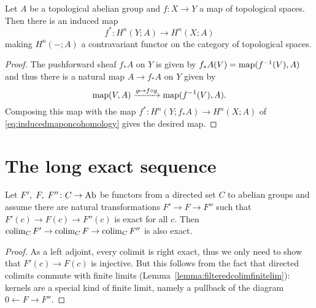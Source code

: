 \documentclass[a4paper,openany]{scrbook}
\begin{document}
\begin{lemma}
Let $A$ be a topological abelian group and $f\colon X \to Y$ a map of topological spaces. Then there is an induced map
\[
f^*\colon H^n(Y;A) \to H^n(X;A)
\]
making $H^n(-;A)$ a contravariant functor on the category of topological spaces.
\end{lemma}
\begin{proof}
The pushforward sheaf $f_*A$ on $Y$ is given by $f_*A(V) = \operatorname{map}(f^{-1}(V),A)$ and thus there is a natural map $A \to f_*A$ on $Y$ given by
\[
\operatorname{map}(V,A) \xrightarrow{g \mapsto f \circ g} \operatorname{map}(f^{-1}(V),A).
\] 
Composing this map with the map $f^*\colon H^n(Y;f_*A) \to H^n(X;A)$ of \eqref{eq:inducedmaponcohomology} gives the desired map.
\end{proof}

\section{The long exact sequence}

\begin{lemma}\label{lemma:colimexact}
Let $F', \; F,\; F''\colon C \to \operatorname{Ab}$ be functors from a directed set $C$ to abelian groups and assume there are natural transformations $F' \to F \to F''$ such that $F'(c) \to F(c) \to F''(c) $ is exact for all $c$. Then $\operatorname*{colim}_C F' \to \operatorname*{colim}_C F \to \operatorname*{colim}_C F''$ is also exact.
\end{lemma}
\begin{proof}
As a left adjoint, every colimit is right exact, thus we only need to show that $F'(c) \to F(c)$ is injective. But this follows from the fact that directed colimits commute with finite limits (Lemma~\ref{lemma:filteredcolimfinitelim}): kernels are a special kind of finite limit, namely a pullback of the diagram $0 \leftarrow F \rightarrow F''$.
\end{proof}
\end{document}

